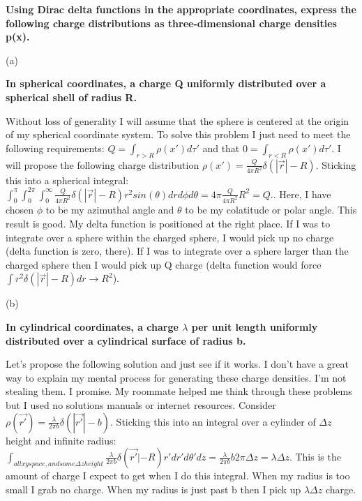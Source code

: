 \begin{homeworkProblem}

\textbf{Using Dirac delta functions in the appropriate coordinates, express the following 
charge distributions as three-dimensional charge densities p(x). }

\begin{homeworkSection}{(a)} 

\textbf{In spherical coordinates, a charge Q uniformly distributed over a spherical 
shell of radius R. }

Without loss of generality I will assume that the sphere is centered at the origin of my spherical coordinate system. To solve this problem I just need to meet the following requirements: $Q = \int_{r>R} \rho(x')d\tau'$ and that $0 = \int_{r<R} \rho(x')d\tau '$. I will propose the following charge distribution $\rho(x') = \frac{Q}{4\pi R^2} \delta(|\vec{r}|-R)$. Sticking this into a spherical integral: $\int_0^\pi \int_0^{2\pi} \int_0^\infty \frac{Q}{4\pi R^2} \delta(|\vec{r}|-R) r^2 sin(\theta) dr d\phi d\theta = 4\pi \frac{Q}{4\pi R^2}R^2 = Q.$. Here, I have chosen $\phi$ to be my azimuthal angle and $\theta$ to be my colatitude or polar angle. This result is good. My delta function is positioned at the right place.  If I was to integrate over a sphere within the charged sphere, I would pick up no charge (delta function is zero, there). If I was to integrate over a sphere larger than the charged sphere then I would pick up Q charge (delta function would force $\int r^2 \delta(|\vec{r}|-R) dr \rightarrow R^2$).

\end{homeworkSection}

\begin{homeworkSection}{(b)}

\textbf{In cylindrical coordinates, a charge $\lambda$ per unit length uniformly distributed 
over a cylindrical surface of radius b. }

Let's propose the following solution and just see if it works. I don't have a great way to explain my mental process for generating these charge densities. I'm not stealing them. I promise. My roommate helped me think through these problems but I used no solutions manuals or internet resources. Consider $\rho(\vec{r'}) = \frac{\lambda}{2\pi b} \delta(|\vec{r'}|-b)$. Sticking this into an integral over a cylinder of $\Delta z$ height and infinite radius: $\int_{all xy space, and some \Delta z height} \frac{\lambda}{2\pi b} \delta(\vec{r'}|-R) r' dr' d\theta' dz = \frac{\lambda}{2\pi b} b 2\pi \Delta z = \lambda \Delta z$. This is the amount of charge I expect to get when I do this integral. When my radius is too small I grab no charge. When my radius is just past b then I pick up $\lambda \Delta z$ charge.


\end{homeworkSection}
\end{homeworkProblem}
